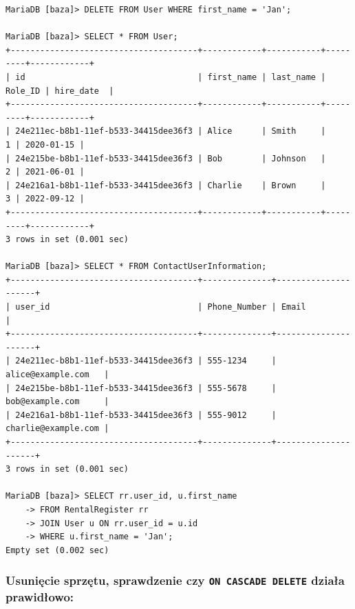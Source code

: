 \documentclass{article}
\begin{document}
\begin{verbatim}
MariaDB [baza]> DELETE FROM User WHERE first_name = 'Jan';

MariaDB [baza]> SELECT * FROM User;
+--------------------------------------+------------+-----------+---------+------------+
| id                                   | first_name | last_name | Role_ID | hire_date  |
+--------------------------------------+------------+-----------+---------+------------+
| 24e211ec-b8b1-11ef-b533-34415dee36f3 | Alice      | Smith     |       1 | 2020-01-15 |
| 24e215be-b8b1-11ef-b533-34415dee36f3 | Bob        | Johnson   |       2 | 2021-06-01 |
| 24e216a1-b8b1-11ef-b533-34415dee36f3 | Charlie    | Brown     |       3 | 2022-09-12 |
+--------------------------------------+------------+-----------+---------+------------+
3 rows in set (0.001 sec)

MariaDB [baza]> SELECT * FROM ContactUserInformation;
+--------------------------------------+--------------+---------------------+
| user_id                              | Phone_Number | Email               |
+--------------------------------------+--------------+---------------------+
| 24e211ec-b8b1-11ef-b533-34415dee36f3 | 555-1234     | alice@example.com   |
| 24e215be-b8b1-11ef-b533-34415dee36f3 | 555-5678     | bob@example.com     |
| 24e216a1-b8b1-11ef-b533-34415dee36f3 | 555-9012     | charlie@example.com |
+--------------------------------------+--------------+---------------------+
3 rows in set (0.001 sec)

MariaDB [baza]> SELECT rr.user_id, u.first_name 
    -> FROM RentalRegister rr 
    -> JOIN User u ON rr.user_id = u.id 
    -> WHERE u.first_name = 'Jan';
Empty set (0.002 sec)
\end{verbatim}

\subsubsection*{Usunięcie sprzętu, sprawdzenie czy \texttt{ON CASCADE DELETE} działa prawidłowo:}
\end{document}
